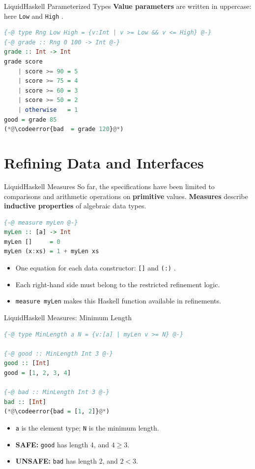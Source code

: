 \documentclass[aspectratio=169]{beamer}
\let\originaltexttt\texttt
\renewcommand{\texttt}[1]{%
  \begingroup
  \setlength{\fboxsep}{2pt}%
  \colorbox{themeTrack!65}{%
    \textcolor{themeText}{\originaltexttt{#1}}%
  }%
  \endgroup
}
\newcommand{\codeerror}[1]{%
  \begingroup
  \setlength{\fboxsep}{0pt}%
  \colorbox{themeAlert!12}{%
    \hspace{3pt}\color{themeAlert}\ttfamily\strut\detokenize{#1}\hspace{3pt}%
  }%
  \endgroup
}
\begin{document}
\begin{frame}[fragile]{LiquidHaskell Parameterized Types}
	\textbf{Value parameters} are written in uppercase: here \texttt{Low} and \texttt{High}.

	\begin{lstlisting}[language=Haskell]
{-@ type Rng Low High = {v:Int | v >= Low && v <= High} @-}
{-@ grade :: Rng 0 100 -> Int @-}
grade :: Int -> Int
grade score
    | score >= 90 = 5
    | score >= 75 = 4
    | score >= 60 = 3
    | score >= 50 = 2
    | otherwise   = 1
good = grade 85
(*@\codeerror{bad  = grade 120}@*)
\end{lstlisting}
\end{frame}

\section{Refining Data and Interfaces}

\begin{frame}[fragile]{LiquidHaskell Measures}
	So far, the specifications have been limited to comparisons and arithmetic operations on \textbf{primitive} values. \textbf{Measures} describe \textbf{inductive properties} of algebraic data types.

	\begin{lstlisting}[language=Haskell]
{-@ measure myLen @-}
myLen :: [a] -> Int
myLen []     = 0
myLen (x:xs) = 1 + myLen xs
\end{lstlisting}

	\begin{itemize}
		\item One equation for each data constructor: \texttt{[]} and \texttt{(:)}.
		\item Each right-hand side must belong to the restricted refinement logic.
		\item \texttt{measure myLen} makes this Haskell function available in refinements.
	\end{itemize}
\end{frame}

\begin{frame}[fragile]{LiquidHaskell Measures: Minimum Length}
	\begin{lstlisting}[language=Haskell]
{-@ type MinLength a N = {v:[a] | myLen v >= N} @-}

{-@ good :: MinLength Int 3 @-}
good :: [Int]
good = [1, 2, 3, 4]

{-@ bad :: MinLength Int 3 @-}
bad :: [Int]
(*@\codeerror{bad = [1, 2]}@*)
\end{lstlisting}

	\begin{itemize}
		\item \texttt{a} is the element type; \texttt{N} is the minimum length.
		\item \textbf{SAFE:} \texttt{good} has length 4, and \(4 \ge 3\).
		\item \textbf{UNSAFE:} \texttt{bad} has length 2, and \(2 < 3\).
	\end{itemize}
\end{frame}
\end{document}
